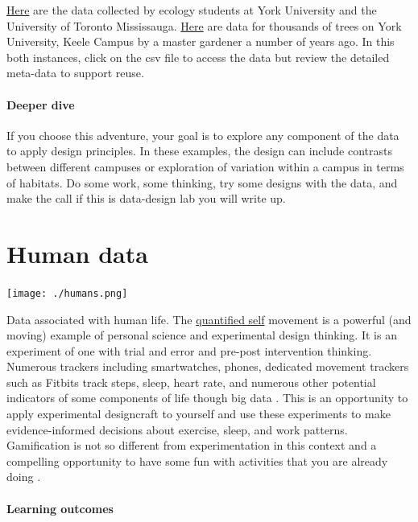 \documentclass[
]{book}
\begin{document}
\href{https://knb.ecoinformatics.org/view/doi\%3A10.5063\%2FF1CN728G}{Here} are the data collected by ecology students at York University and the University of Toronto Mississauga. \href{https://knb.ecoinformatics.org/view/doi\%3A10.5063\%2FF13F4MZC}{Here} are data for thousands of trees on York University, Keele Campus by a master gardener a number of years ago. In this both instances, click on the csv file to access the data but review the detailed meta-data to support reuse.

\hypertarget{deeper-dive-4}{%
\subsubsection*{Deeper dive}\label{deeper-dive-4}}

If you choose this adventure, your goal is to explore any component of the data to apply design principles. In these examples, the design can include contrasts between different campuses or exploration of variation within a campus in terms of habitats. Do some work, some thinking, try some designs with the data, and make the call if this is data-design lab you will write up.

\hypertarget{humans}{%
\chapter{Human data}\label{humans}}

\texttt{[image: ./humans.png]}

Data associated with human life. The \href{https://quantifiedself.com}{quantified self} movement is a powerful (and moving) example of personal science and experimental design thinking. It is an experiment of one with trial and error and pre-post intervention thinking. Numerous trackers including smartwatches, phones, dedicated movement trackers such as Fitbits track steps, sleep, heart rate, and numerous other potential indicators of some components of life though big data \citep{RN6807}. This is an opportunity to apply experimental designcraft to yourself and use these experiments to make evidence-informed decisions about exercise, sleep, and work patterns. Gamification is not so different from experimentation in this context and a compelling opportunity to have some fun with activities that you are already doing \citep{RN6808}.

\hypertarget{learning-outcomes-5}{%
\subsubsection*{Learning outcomes}\label{learning-outcomes-5}}
\end{document}
